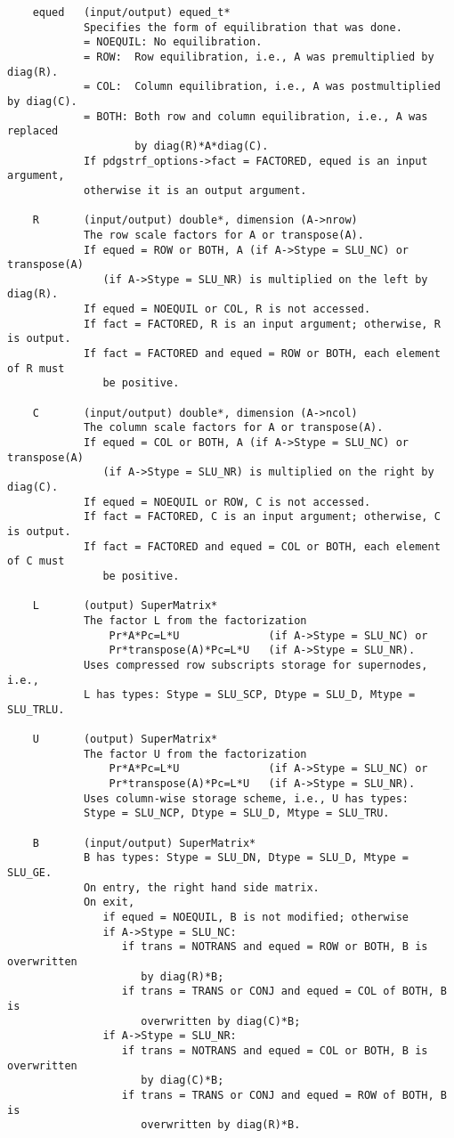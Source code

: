 \begin{verbatim}
    equed   (input/output) equed_t*
            Specifies the form of equilibration that was done.
            = NOEQUIL: No equilibration.
            = ROW:  Row equilibration, i.e., A was premultiplied by diag(R).
            = COL:  Column equilibration, i.e., A was postmultiplied by diag(C).
            = BOTH: Both row and column equilibration, i.e., A was replaced 
                    by diag(R)*A*diag(C).
            If pdgstrf_options->fact = FACTORED, equed is an input argument, 
            otherwise it is an output argument.

    R       (input/output) double*, dimension (A->nrow)
            The row scale factors for A or transpose(A).
            If equed = ROW or BOTH, A (if A->Stype = SLU_NC) or transpose(A)
               (if A->Stype = SLU_NR) is multiplied on the left by diag(R).
            If equed = NOEQUIL or COL, R is not accessed.
            If fact = FACTORED, R is an input argument; otherwise, R is output.
            If fact = FACTORED and equed = ROW or BOTH, each element of R must
               be positive.

    C       (input/output) double*, dimension (A->ncol)
            The column scale factors for A or transpose(A).
            If equed = COL or BOTH, A (if A->Stype = SLU_NC) or transpose(A)
               (if A->Stype = SLU_NR) is multiplied on the right by diag(C).
            If equed = NOEQUIL or ROW, C is not accessed.
            If fact = FACTORED, C is an input argument; otherwise, C is output.
            If fact = FACTORED and equed = COL or BOTH, each element of C must
               be positive.

    L       (output) SuperMatrix*
            The factor L from the factorization
                Pr*A*Pc=L*U              (if A->Stype = SLU_NC) or
                Pr*transpose(A)*Pc=L*U   (if A->Stype = SLU_NR).
            Uses compressed row subscripts storage for supernodes, i.e.,
            L has types: Stype = SLU_SCP, Dtype = SLU_D, Mtype = SLU_TRLU.

    U       (output) SuperMatrix*
            The factor U from the factorization
                Pr*A*Pc=L*U              (if A->Stype = SLU_NC) or
                Pr*transpose(A)*Pc=L*U   (if A->Stype = SLU_NR).
            Uses column-wise storage scheme, i.e., U has types:
            Stype = SLU_NCP, Dtype = SLU_D, Mtype = SLU_TRU.

    B       (input/output) SuperMatrix*
            B has types: Stype = SLU_DN, Dtype = SLU_D, Mtype = SLU_GE.
            On entry, the right hand side matrix.
            On exit,
               if equed = NOEQUIL, B is not modified; otherwise
               if A->Stype = SLU_NC:
                  if trans = NOTRANS and equed = ROW or BOTH, B is overwritten
                     by diag(R)*B;
                  if trans = TRANS or CONJ and equed = COL of BOTH, B is
                     overwritten by diag(C)*B;
               if A->Stype = SLU_NR:
                  if trans = NOTRANS and equed = COL or BOTH, B is overwritten
                     by diag(C)*B;
                  if trans = TRANS or CONJ and equed = ROW of BOTH, B is
                     overwritten by diag(R)*B.


\end{verbatim}
